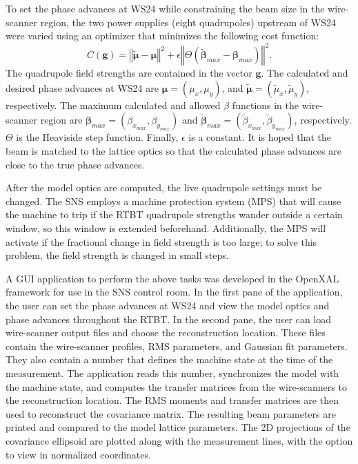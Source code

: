 To set the phase advances at WS24 while constraining the beam size in the wire-scanner region, the two power supplies (eight quadrupoles) upstream of WS24 were varied using an optimizer that minimizes the following cost function:
%
\begin{equation}
    C(\mathbf{g}) = \left\Vert{\tilde{\bm{\mu}} - \bm{\mu} }\right\Vert^2
    + 
    \epsilon
    \left\Vert
    \Theta\left(
        \tilde{\bm{\beta}}_{max} - \bm{\beta}_{max}
    \right)
    \right\Vert^2
    .
\end{equation}
%
The quadrupole field strengths are contained in the vector $\mathbf{g}$. The calculated and desired phase advances at WS24 are $\bm{\mu} = (\mu_x, \mu_y)$, and $\tilde{\bm{\mu}} = (\tilde{\mu}_x, \tilde{\mu}_y)$, respectively. The maximum calculated and allowed $\beta$ functions in the wire-scanner region are $\bm{\beta}_{max} = (\beta_{x_{max}}, \beta_{y_{max}})$ and $\tilde{\bm{\beta}}_{max} = (\tilde{\beta}_{x_{max}}, \tilde{\beta}_{y_{max}})$, respectively. $\Theta$ is the Heaviside step function. Finally, $\epsilon$ is a constant. It is hoped that the beam is matched to the lattice optics so that the calculated phase advances are close to the true phase advances.

After the model optics are computed, the live quadrupole settings must be changed. The SNS employs a machine protection system (MPS) that will cause the machine to trip if the RTBT quadrupole strengths wander outside a certain window, so this window is extended beforehand. Additionally, the MPS will activate if the fractional change in field strength is too large; to solve this problem, the field strength is changed in small steps. 

A GUI application to perform the above tasks was developed in the OpenXAL framework for use in the SNS control room. In the first pane of the application, the user can set the phase advances at WS24 and view the model optics and phase advances throughout the RTBT. In the second pane, the user can load wire-scanner output files and choose the reconstruction location. These files contain the wire-scanner profiles, RMS parameters, and Gaussian fit parameters. They also contain a number that defines the machine state at the time of the measurement. The application reads this number, synchronizes the model with the machine state, and computes the transfer matrices from the wire-scanners to the reconstruction location. The RMS moments and transfer matrices are then used to reconstruct the covariance matrix. The resulting beam parameters are printed and compared to the model lattice parameters. The 2D projections of the covariance ellipsoid are plotted along with the measurement lines, with the option to view in normalized coordinates. 



